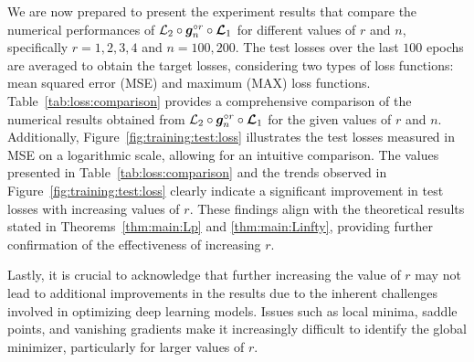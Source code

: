 \documentclass[nohyperref]{article}
\theoremstyle{plain}
\theoremstyle{definition}
\theoremstyle{remark}
\begin{document}
We are now prepared to present the experiment results that compare the numerical performances of ${\mathcal{L}}_2\circ {\bm{g}}_n^{\circ r}\circ {\bm{\mathcal{L}}}_1$ for different values of $r$ and $n$, specifically $r=1,2,3,4$ and $n=100,200$. The test losses over the last $100$ epochs are averaged to obtain the target losses, considering two types of loss functions: mean squared error (MSE) and maximum (MAX) loss functions.
Table~\ref{tab:loss:comparison} provides a comprehensive comparison of the numerical results obtained from ${\mathcal{L}}_2\circ {\bm{g}}_n^{\circ r}\circ {\bm{\mathcal{L}}}_1$ for the given values of $r$ and $n$. Additionally, Figure~\ref{fig:training:test:loss} illustrates the test losses measured in MSE on a logarithmic scale, allowing for an intuitive comparison.
The values presented in Table~\ref{tab:loss:comparison} and the trends observed in Figure~\ref{fig:training:test:loss} clearly indicate a significant improvement in test losses with increasing values of $r$.
These findings align with the theoretical results stated in Theorems~\ref{thm:main:Lp} and \ref{thm:main:Linfty}, providing further confirmation of the effectiveness of increasing $r$.

Lastly, it is crucial to acknowledge that
further increasing the value of $r$ may not lead to additional improvements in the results due to the inherent challenges involved in optimizing deep learning models. Issues such as local minima, saddle points, and vanishing gradients make it increasingly difficult to identify the global minimizer, particularly for larger values of $r$.




\end{document}

